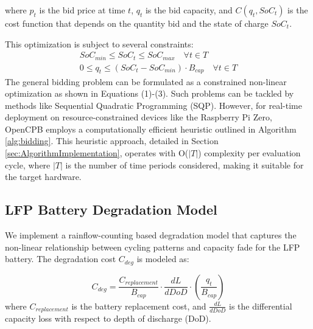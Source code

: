 \documentclass[11pt,a4paper]{article}
\begin{document}
where $p_t$ is the bid price at time $t$, $q_t$ is the bid capacity, and $C(q_t, SoC_t)$ is the cost function that depends on the quantity bid and the state of charge $SoC_t$.

This optimization is subject to several constraints:
\begin{align}
SoC_{min} \leq SoC_t \leq SoC_{max} \quad \forall t \in T\\
0 \leq q_t \leq (SoC_t - SoC_{min}) \cdot B_{cap} \quad \forall t \in T
\end{align}
The general bidding problem can be formulated as a constrained non-linear optimization as shown in Equations (1)-(3). Such problems can be tackled by methods like Sequential Quadratic Programming (SQP). However, for real-time deployment on resource-constrained devices like the Raspberry Pi Zero, OpenCPB employs a computationally efficient heuristic outlined in Algorithm \ref{alg:bidding}. This heuristic approach, detailed in Section \ref{sec:AlgorithmImplementation}, operates with O($|T|$) complexity per evaluation cycle, where $|T|$ is the number of time periods considered, making it suitable for the target hardware.

\subsection{LFP Battery Degradation Model}
We implement a rainflow-counting based degradation model that captures the non-linear relationship between cycling patterns and capacity fade for the LFP battery. The degradation cost $C_{deg}$ is modeled as:

\begin{equation}
C_{deg} = \frac{C_{replacement}}{B_{cap}} \cdot \frac{dL}{dDoD} \cdot \left( \frac{q_t}{B_{cap}} \right)
\end{equation}
where $C_{replacement}$ is the battery replacement cost, and $\frac{dL}{dDoD}$ is the differential capacity loss with respect to depth of discharge (DoD).
\end{document}
